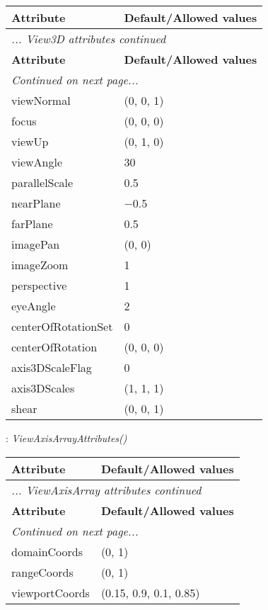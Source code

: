 \documentclass[10pt,a4paper]{report}
\begin{document}
\begin{longtable}{ll}
{\bf Attribute} & {\bf Default/Allowed values} \\
\hline \hline
\endfirsthead
\multicolumn{2}{l}{{\it ... View3D attributes continued}} \\
{\bf Attribute} & {\bf Default/Allowed values} \\
\hline \hline
\endhead
\hline
\multicolumn{2}{l}{{\it Continued on next page...}} \\
\endfoot
\hline
\endlastfoot

viewNormal  &  (0, 0, 1) \\
focus  &  (0, 0, 0) \\
viewUp  &  (0, 1, 0) \\
viewAngle  &  30 \\
parallelScale  &  0.5 \\
nearPlane  &  $-$0.5 \\
farPlane  &  0.5 \\
imagePan  &  (0, 0) \\
imageZoom  &  1 \\
perspective  &  1 \\
eyeAngle  &  2 \\
centerOfRotationSet  &  0 \\
centerOfRotation  &  (0, 0, 0) \\
axis3DScaleFlag  &  0 \\
axis3DScales  &  (1, 1, 1) \\
shear  &  (0, 0, 1) \\
\end{longtable}

\newpage

{}
: {\it ViewAxisArrayAttributes() }\\[-3mm]

\begin{longtable}{ll}
{\bf Attribute} & {\bf Default/Allowed values} \\
\hline \hline
\endfirsthead
\multicolumn{2}{l}{{\it ... ViewAxisArray attributes continued}} \\
{\bf Attribute} & {\bf Default/Allowed values} \\
\hline \hline
\endhead
\hline
\multicolumn{2}{l}{{\it Continued on next page...}} \\
\endfoot
\hline
\endlastfoot

domainCoords  &  (0, 1) \\
rangeCoords  &  (0, 1) \\
viewportCoords  &  (0.15, 0.9, 0.1, 0.85) \\
\end{longtable}
\end{document}
